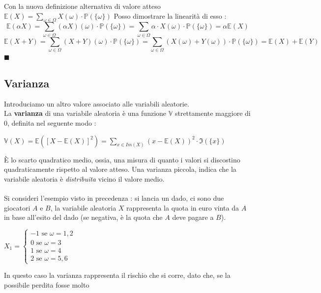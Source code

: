 \documentclass[12pt, letterpaper]{article}
\newcommand{\E}{{\mathbb E}}
\newcommand{\Prob}{{\mathbb P}}
\begin{document}
Con la nuova definizione alternativa di valore atteso 
\(
    \E(X)=\displaystyle\sum_{\omega\in\Omega}X(\omega)\cdot\Prob(\{\omega\})
    \)
Posso dimostrare la linearità di esso :\begin{equation}
    \E(\alpha X)=\sum_{\omega\in\Omega}(\alpha X)(\omega)\cdot\Prob(\{\omega\})=\sum_{\omega\in\Omega}\alpha\cdot X(\omega)\cdot\Prob(\{\omega\})=\alpha\E(X)
\end{equation}\begin{equation}
    \E(X+Y)=\sum_{\omega\in\Omega}(X+Y)(\omega)\cdot\Prob(\{\omega\})=\sum_{\omega\in\Omega}(X(\omega)+Y(\omega))\cdot\Prob(\{\omega\})=\E(X)+\E(Y)
\end{equation}
\raggedleft\(\blacksquare\)\\
\raggedright

\subsection{Varianza}
Introduciamo un altro valore associato alle variabili aleatorie.\\
La \textbf{varianza} di una variabile aleatoria è una funzione \(\mathbb{V}\) strettamente maggiore di 0, definita nel seguente modo :
\begin{center}
    \(
    \mathbb{V}(X)=\E([X-\E(X)]^2)=\displaystyle\sum_{x\in Im(X)}(x-\mathbb{E}(X))^2\cdot   \Im(\{x\})  
    \)
\end{center}
È lo scarto quadratico medio, ossia, una misura di quanto i valori si discostino 
quadraticamente rispetto al valore atteso. Una varianza piccola, indica che la variabile 
aleatoria è \textit{distribuita} vicino il valore medio.\\\hphantom{}\\
Si consideri l'esempio visto in precedenza : si lancia un dado, ci sono due giocatori \(A\) e \(B\), la variabile aleatoria \(X\) 
rappresenta la quota in euro vinta da \(A\) in base all'esito del dado (se negativa, è la quota che \(A\) deve pagare 
a \(B\)).\begin{center}
    \(
    X_1=\begin{cases}
        -1\text{ se }\omega=1,2\\
        0\text{ se  }\omega=3\\
        1\text{  se }\omega=4\\
        2\text{ se  }\omega=5,6
    \end{cases}    
    \)
\end{center}
In questo caso la varianza rappresenta il rischio che si corre, dato che, se la possibile perdita fosse molto 
\end{document}
